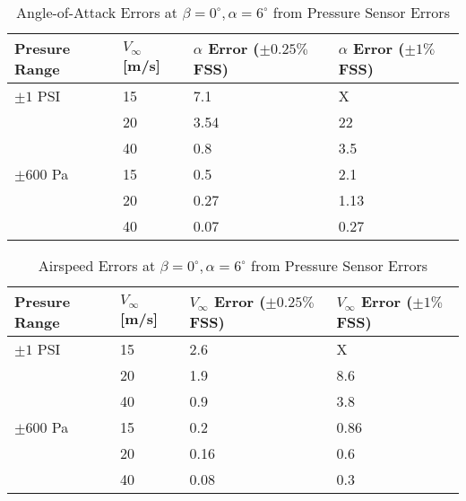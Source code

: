 \documentclass{article}
\begin{document}
\begin{table}
\caption{Angle-of-Attack Errors at $\beta = 0^\circ, \alpha = 6^\circ$ from Pressure Sensor Errors \label{hsc_errors}}
\begin{tabular}{|l|l|l|l|}
\hline
Presure Range & $V_\infty$ [m/s] & $\alpha$ Error ($\pm 0.25\%$ FSS) & $\alpha$ Error ($\pm 1\%$ FSS) \\
\hline
$\pm 1$ PSI & 15 & 7.1 & X \\
 & 20 & 3.54 & 22 \\
 & 40 & 0.8 & 3.5 \\
$\pm 600$ Pa & 15 & 0.5 & 2.1 \\
& 20 & 0.27 & 1.13 \\
& 40 & 0.07 & 0.27\\
\hline
\end{tabular}
\end{table}
\begin{table}
\caption{Airspeed Errors at $\beta = 0^\circ, \alpha = 6^\circ$ from Pressure Sensor Errors \label{hsc_airspeed_errors}}
\begin{tabular}{|l|l|l|l|}
\hline
Presure Range & $V_\infty$ [m/s] & $V_\infty$ Error ($\pm 0.25\%$ FSS) & $V_\infty$ Error ($\pm 1\%$ FSS) \\
\hline
$\pm 1$ PSI & 15 & 2.6 & X \\
 & 20 & 1.9 & 8.6 \\
 & 40 & 0.9 & 3.8 \\
$\pm 600$ Pa & 15 & 0.2 & 0.86 \\
& 20 & 0.16 & 0.6 \\
& 40 & 0.08 & 0.3\\
\hline
\end{tabular}
\end{table}





\end{document}
